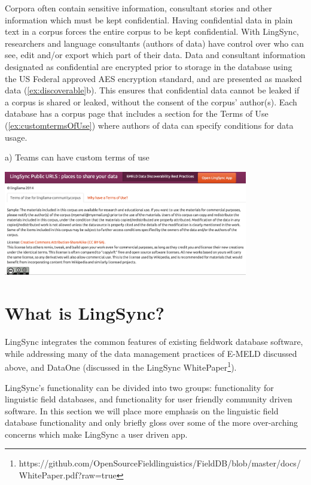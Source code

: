\documentclass[letterpaper, 12pt, dvips]{mitwpl}
\begin{document}
\begin{description}
Corpora often contain sensitive information, consultant stories and other information which must be kept confidential. Having confidential data in plain text in a corpus forces the entire corpus to be kept confidential. With LingSync, researchers and language consultants (authors of data) have control over who can see, edit and/or export which part of their data. Data and consultant information designated as confidential are encrypted prior to storage in the database using the US Federal approved AES encryption standard, and are presented as masked data (\ref{ex:discoverable}b). This ensures that confidential data cannot be leaked if a corpus is shared or leaked, without the consent of the corpus' author(s). Each database has a corpus page that includes a section for the Terms of Use (\ref{ex:customtermsOfUse})  where authors of data can specify conditions for data usage. 



\begin{exe} 
\ex a) Teams can have custom terms of use

 \centering
   \includegraphics[width=0.8\textwidth]{customtermsOfUse}

\label{ex:customtermsOfUse}
\end{exe}

\end{description} 





\section{What is LingSync?}


LingSync integrates the common features of existing fieldwork database software,
while addressing many of the data management practices of E-MELD discussed above, and DataOne (discussed in the LingSync WhitePaper\footnote{https://github.com/OpenSourceFieldlinguistics/FieldDB/blob/master/docs/WhitePaper.pdf?raw=true}).


LingSync's functionality can be divided into two groups: functionality for linguistic field databases,
and functionality for user friendly community driven software.
In this section we will place more emphasis on the linguistic field database functionality and only briefly gloss over some of the more over-arching concerns which make LingSync a user driven app.
\end{document}
